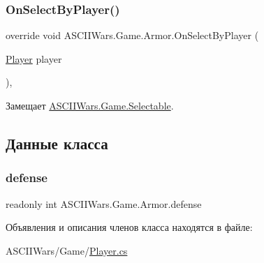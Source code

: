 \subsubsection{\texorpdfstring{On\+Select\+By\+Player()}{OnSelectByPlayer()}}
{\footnotesize\ttfamily override void A\+S\+C\+I\+I\+Wars.\+Game.\+Armor.\+On\+Select\+By\+Player (\begin{DoxyParamCaption}\item[{\hyperlink{class_a_s_c_i_i_wars_1_1_game_1_1_player}{Player}}]{player }\end{DoxyParamCaption})\hspace{0.3cm}{\ttfamily [inline]}, {\ttfamily [virtual]}}



Замещает \hyperlink{class_a_s_c_i_i_wars_1_1_game_1_1_selectable_a95bdcf05ef9ea5f39c81ddd96294968a}{A\+S\+C\+I\+I\+Wars.\+Game.\+Selectable}.



\subsection{Данные класса}
\hypertarget{class_a_s_c_i_i_wars_1_1_game_1_1_armor_ac056d4feeb6864656f00144af7a4ed8b}{}\label{class_a_s_c_i_i_wars_1_1_game_1_1_armor_ac056d4feeb6864656f00144af7a4ed8b} 
\subsubsection{\texorpdfstring{defense}{defense}}
{\footnotesize\ttfamily readonly int A\+S\+C\+I\+I\+Wars.\+Game.\+Armor.\+defense}



Объявления и описания членов класса находятся в файле\+:\begin{DoxyCompactItemize}
\item 
A\+S\+C\+I\+I\+Wars/\+Game/\hyperlink{_player_8cs}{Player.\+cs}\end{DoxyCompactItemize}
